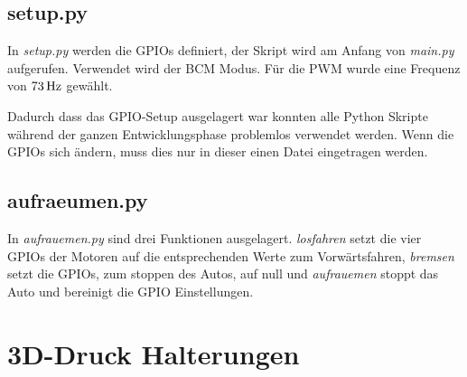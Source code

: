 \documentclass[a4paper, 12pt]{scrartcl}
\begin{document}
\newpage
\subsection{setup.py}	%


In \textit{setup.py} werden die GPIOs definiert, der Skript wird am Anfang von \textit{main.py} aufgerufen. Verwendet wird der BCM Modus. Für die PWM wurde eine Frequenz von $\unit[73]{Hz}$ gewählt.

Dadurch dass das GPIO-Setup ausgelagert war konnten alle Python Skripte während der ganzen Entwicklungsphase problemlos verwendet werden. Wenn die GPIOs sich ändern, muss dies nur in dieser einen Datei eingetragen werden.

\newpage
\subsection{aufraeumen.py}	%


In \textit{aufrauemen.py} sind drei Funktionen ausgelagert. \textit{losfahren} setzt die vier GPIOs der Motoren auf die entsprechenden Werte zum Vorwärtsfahren, \textit{bremsen} setzt die GPIOs, zum stoppen des Autos, auf null und \textit{aufrauemen} stoppt das Auto und bereinigt die GPIO Einstellungen.


\newpage
\section{3D-Druck Halterungen}
\end{document}
